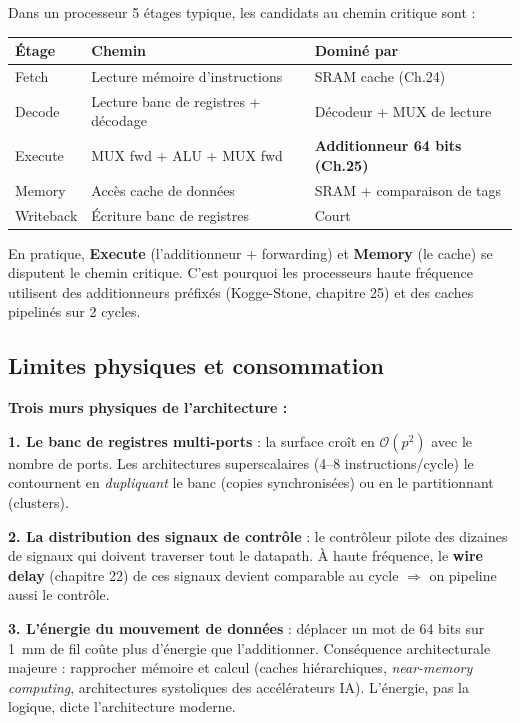 \documentclass[12pt,a4paper,twoside]{book}
\begin{document}
\begin{formule}
Dans un processeur 5 étages typique, les candidats au chemin critique sont :

\begin{center}
\renewcommand{\arraystretch}{1.3}
\begin{tabular}{p{2.5cm}p{6cm}p{4.5cm}}
\toprule
\textbf{Étage} & \textbf{Chemin} & \textbf{Dominé par} \\
\midrule
Fetch & Lecture mémoire d'instructions & SRAM cache (Ch.24) \\
Decode & Lecture banc de registres + décodage & Décodeur + MUX de lecture \\
Execute & MUX fwd + ALU + MUX fwd & \textbf{Additionneur 64 bits (Ch.25)} \\
Memory & Accès cache de données & SRAM + comparaison de tags \\
Writeback & Écriture banc de registres & Court \\
\bottomrule
\end{tabular}
\end{center}

En pratique, \textbf{Execute} (l'additionneur + forwarding) et \textbf{Memory} (le cache) se disputent le chemin critique. C'est pourquoi les processeurs haute fréquence utilisent des additionneurs préfixés (Kogge-Stone, chapitre 25) et des caches pipelinés sur 2 cycles.
\end{formule}

\subsection{Limites physiques et consommation}

\begin{formule}
\textbf{Trois murs physiques de l'architecture :}

\textbf{1. Le banc de registres multi-ports} : la surface croît en $\mathcal{O}(p^2)$ avec le nombre de ports. Les architectures superscalaires (4--8 instructions/cycle) le contournent en \textit{dupliquant} le banc (copies synchronisées) ou en le partitionnant (clusters).

\textbf{2. La distribution des signaux de contrôle} : le contrôleur pilote des dizaines de signaux qui doivent traverser tout le datapath. À haute fréquence, le \textbf{wire delay} (chapitre 22) de ces signaux devient comparable au cycle $\Rightarrow$ on pipeline aussi le contrôle.

\textbf{3. L'énergie du mouvement de données} : déplacer un mot de 64 bits sur \SI{1}{mm} de fil coûte plus d'énergie que l'additionner. Conséquence architecturale majeure : rapprocher mémoire et calcul (caches hiérarchiques, \textit{near-memory computing}, architectures systoliques des accélérateurs IA). L'énergie, pas la logique, dicte l'architecture moderne.
\end{formule}
\end{document}
